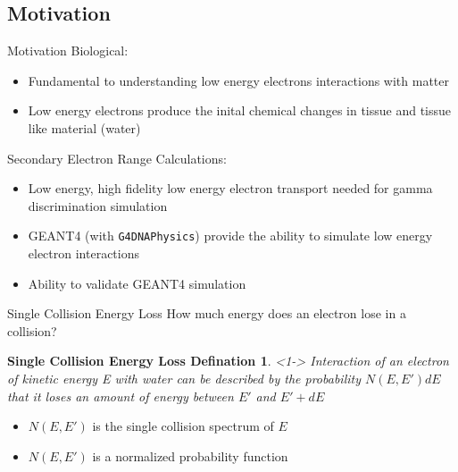 \documentclass[compress]{beamer}
\begin{document}
\subsection{Motivation}
\begin{frame}[fragile]{Motivation}
  Biological:
  \begin{itemize}
  \item Fundamental to understanding low energy electrons interactions with matter
  \item Low energy electrons produce the inital chemical changes in tissue and tissue like material (water)
  \end{itemize}
  Secondary Electron Range Calculations:
  \begin{itemize}
    \item Low energy, high fidelity low energy electron transport needed for gamma discrimination simulation
    \item GEANT4 (with \verb+G4DNAPhysics+) provide the ability to simulate low energy electron interactions
    \item Ability to validate GEANT4 simulation
  \end{itemize}
\end{frame}
\begin{frame}{Single Collision Energy Loss}
How much energy does an electron lose in a collision?
  \newtheorem{thm1}{Single Collision Energy Loss Defination}
  \begin{thm1}<1->
    \small
    Interaction of an electron of kinetic energy E with water can be described by the probability $N(E,E')dE$ that it loses an amount of energy between $E'$ and $E'+dE$
  \end{thm1}
  \begin{itemize}
    \item $N(E,E')$ is the single collision spectrum of $E$
    \item $N(E,E')$ is a normalized probability function
  \end{itemize}
\end{frame}
\end{document}
